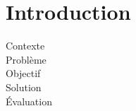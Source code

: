 \chapter*{Introduction}
	\thispagestyle{introduction}
		Contexte \\
		Problème \\
		Objectif \\
		Solution \\
		Évaluation